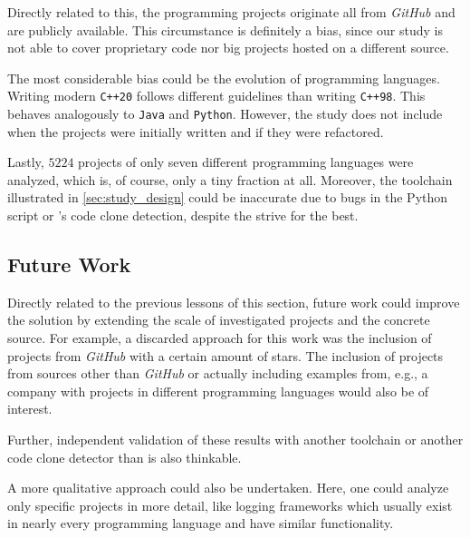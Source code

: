 Directly related to this, the programming projects originate all from \textit{GitHub} and are publicly available. This circumstance is definitely a bias, since our study is not able to cover proprietary code nor big projects hosted on a different source.

The most considerable bias could be the evolution of programming languages. Writing modern \texttt{C++20} follows different guidelines than writing \texttt{C++98}. This behaves analogously to \texttt{Java} and \texttt{Python}. However, the study does not include when the projects were initially written and if they were refactored.

Lastly, $5224$ projects of only seven different programming languages were analyzed, which is, of course, only a tiny fraction at all. Moreover, the toolchain illustrated in \autoref{sec:study_design} could be inaccurate due to bugs in the Python script or \teamscale{}'s code clone detection, despite the strive for the best.

\subsection{Future Work}

Directly related to the previous lessons of this section, future work could improve the solution by extending the scale of investigated projects and the concrete source. For example, a discarded approach for this work was the inclusion of projects from \textit{GitHub} with a certain amount of stars. The inclusion of projects from sources other than \textit{GitHub} or actually including examples from, e.g., a company with projects in different programming languages would also be of interest.

Further, independent validation of these results with another toolchain or another code clone detector than \teamscale{} is also thinkable.

A more qualitative approach could also be undertaken. Here, one could analyze only specific projects in more detail, like logging frameworks which usually exist in nearly every programming language and have similar functionality.
 
